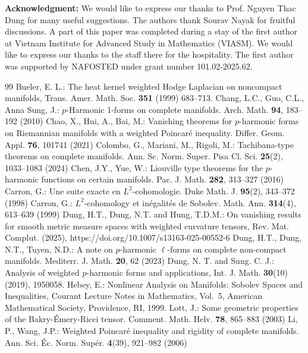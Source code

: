 \documentclass[10pt,a4paper]{amsart}
\numberwithin{equation}{section}
\begin{document}
	\vskip0.1cm
\noindent
{\bf Acknowledgment:}   We would like to express our thanks to Prof. Nguyen Thac Dung for many useful suggestions. The authors thank Sourav Nayak for fruitful discussions. A part of this paper was completed during a stay of the first
author  at Vietnam Institute for Advanced Study in Mathematics (VIASM). We would like to express our thanks to the staff there for the hospitality. The first author  was supported by NAFOSTED under grant number 101.02-2025.62.


\begin{thebibliography}{99}
 Bueler, E. L.: The heat kernel weighted Hodge Laplacian on noncompact manifolds, Trans. Amer. Math. Soc. {\bf 351} (1999) 683--713.
 Chang, L.C., Guo, C.L., Anna Sung, J.: $p$-Harmonic 1-forms on complete manifolds. Arch. Math. \textbf{94}, 183–192 (2010)
 Chao, X., Hui, A., Bai, M.: Vanishing theorems for $p$-harmonic forms on Riemannian manifolds with a weighted Poincaré inequality. Differ. Geom. Appl. {\bf 76}, 101741 (2021)
 Colombo, G., Mariani, M., Rigoli, M.: Tachibana-type theorems on complete manifolds. Ann. Sc. Norm. Super. Pisa Cl. Sci. \textbf{25}(2), 1033–1083 (2024)
 Chen, J.Y., Yue, W.: Liouville type theorems for the $p$-harmonic functions on certain manifolds. Pac. J. Math. {\bf 282}, 313–327 (2016)
 Carron, G.: Une suite exacte en $L^2$-cohomologie. Duke Math. J. \textbf{95}(2), 343–372 (1998)
 Carron, G.: $L^2$-cohomology et inégalités de Sobolev. Math. Ann. \textbf{314}(4), 613–639 (1999)
 Dung, H.T., Dung, N.T. and Hung, T.D.M.: On vanishing results for smooth metric measure spaces with weighted curvature tensors, Rev. Mat. Complut. (2025), https://doi.org/10.1007/s13163-025-00552-6
 Dung, H.T., Dung, N.T., Tuyen, N.D.: A note on $p$-harmonic $\ell$-forms on complete non-compact manifolds. Mediterr. J. Math. \textbf{20}, 62 (2023)
 Dung, N. T. and Sung. C. J.: Analysis of weighted $p$-harmonic forms and applications, Int. J. Math. \textbf{30}(10) (2019), 1950058.
 Hebey, E.: Nonlinear Analysis on Manifolds: Sobolev Spaces and Inequalities, Courant Lecture Notes in Mathematics, Vol.~5, American Mathematical Society, Providence, RI, 1999.
 Lott, J.: Some geometric properties of the Bakry-Émery-Ricci tensor. Comment. Math. Helv. \textbf{78}, 865–883 (2003)
 Li, P., Wang, J.P.: Weighted Poincaré inequality and rigidity of complete manifolds. Ann. Sci. Éc. Norm. Supér. \textbf{4}(39), 921–982 (2006)

\end{thebibliography}
\end{document}
